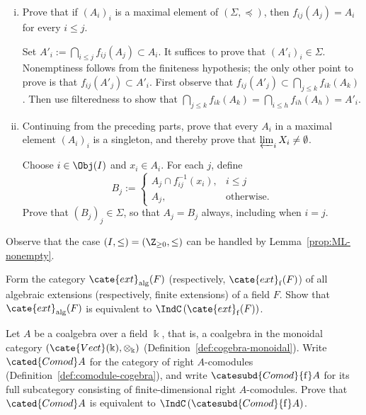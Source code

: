 \begin{Exercises}
\begin{enumerate}[(i)]
		\begin{hint}
			Clearly $\Sigma$ is nonempty. For a chain in $(\Sigma,\preceq)$, check that taking intersections at each index $i$ still gives an element of $\Sigma$, and hence gives an upper bound for the chain. Nonemptiness requires the hypothesis that the sets are finite.
		\end{hint}

		\item Prove that if $(A_i)_i$ is a maximal element of $(\Sigma,\preceq)$, then $f_{ij}(A_j)=A_i$ for every $i\leq j$.

		\begin{hint}
			Set $A'_i:=\bigcap_{i\leq j}f_{ij}(A_j)\subset A_i$. It suffices to prove that $(A'_i)_i\in\Sigma$. Nonemptiness follows from the finiteness hypothesis; the only other point to prove is that $f_{ij}(A'_j)\subset A'_i$. First observe that $f_{ij}(A'_j)\subset\bigcap_{j\leq k}f_{ik}(A_k)$. Then use filteredness to show that $\bigcap_{j\leq k}f_{ik}(A_k)=\bigcap_{i\leq h}f_{ih}(A_h)=A'_i$.
		\end{hint}

		\item Continuing from the preceding parts, prove that every $A_i$ in a maximal element $(A_i)_i$ is a singleton, and thereby prove that $\varprojlim_iX_i\neq\emptyset$.

		\begin{hint}
			Choose $i\in\Obj(I)$ and $x_i\in A_i$. For each $j$, define
			\[ B_j := \begin{cases}
				A_j \cap f_{ij}^{-1}(x_i), & i \leq j \\
				A_j, & \text{otherwise}.
			\end{cases} \]
			Prove that $(B_j)_j\in\Sigma$, so that $A_j=B_j$ always, including when $i=j$.
		\end{hint}
	\end{enumerate}
	Observe that the case $(I,\leq)=(\Z_{\geq 0},\leq)$ can be handled by Lemma~\ref{prop:ML-nonempty}.

	\item Form the category $\cate{ext}_{\mathrm{alg}}(F)$ (respectively, $\cate{ext}_{\mathrm{f}}(F)$) of all algebraic extensions (respectively, finite extensions) of a field $F$. Show that $\cate{ext}_{\mathrm{alg}}(F)$ is equivalent to $\IndC\left(\cate{ext}_{\mathrm{f}}(F)\right)$.

	\item Let $A$ be a coalgebra over a field $\Bbbk$, that is, a coalgebra in the monoidal category $\left(\cate{Vect}(\Bbbk),\otimes_{\Bbbk}\right)$ (Definition~\ref{def:cogebra-monoidal}). Write $\cated{Comod}A$ for the category of right $A$-comodules (Definition~\ref{def:comodule-cogebra}), and write $\catesubd{Comod}{\mathrm{f}}A$ for its full subcategory consisting of finite-dimensional right $A$-comodules. Prove that $\cated{Comod}A$ is equivalent to $\IndC\left(\catesubd{Comod}{\mathrm{f}}A\right)$.


\end{Exercises}
